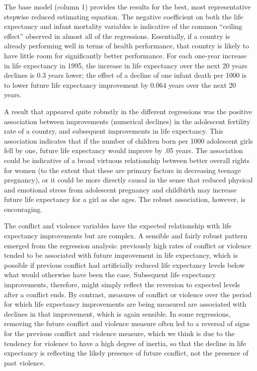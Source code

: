 \documentclass[12pt]{article}
\begin{document}


The base model (column 1) provides the results for the best, most representative stepwise reduced estimating equation. The negative coefficient on both the life expectancy and infant mortality variables is indicative of the common \enquote{ceiling effect} observed in almost all of the regressions. Essentially, if a country is already performing well in terms of health performance, that country is likely to have little room for significantly better performance. For each one-year increase in life expectancy in 1995, the increase in life expectancy over the next 20 years declines is 0.3 years lower; the effect of a decline of one infant death per 1000 is to lower future life expectancy improvement by 0.064 years over the next 20 years.

A result that appeared quite robustly in the different regressions was the positive association between improvements (numerical declines) in the adolescent fertility rate of a country, and subsequent improvements in life expectancy. This association indicates that if the number of children born per 1000 adolescent girls fell by one, future life expectancy would improve by .05 years. The association could be indicative of a broad virtuous relationship between better overall rights for women (to the extent that these are primary factors in decreasing teenage pregnancy), or it could be more directly causal in the sense that reduced physical and emotional stress from adolescent pregnancy and childbirth may increase future life expectancy for a girl as she ages. The robust association, however, is encouraging.

The conflict and violence variables have the expected relationship with life expectancy improvements but are complex. A sensible and fairly robust pattern emerged from the regression analysis: previously high rates of conflict or violence tended to be associated with future improvement in life expectancy, which is possible if previous conflict had artificially reduced life expectancy levels below what would otherwise have been the case. Subsequent life expectancy improvements, therefore, might simply reflect the reversion to expected levels after a conflict ends. By contrast, measures of conflict or violence over the period for which life expectancy improvements are being measured are associated with declines in that improvement, which is again sensible. In some regressions, removing the future conflict and violence measure often led to a reversal of signs for the previous conflict and violence measure, which we think is due to the tendency for violence to have a high degree of inertia, so that the decline in life expectancy is reflecting the likely presence of future conflict, not the presence of past violence.
\end{document}
